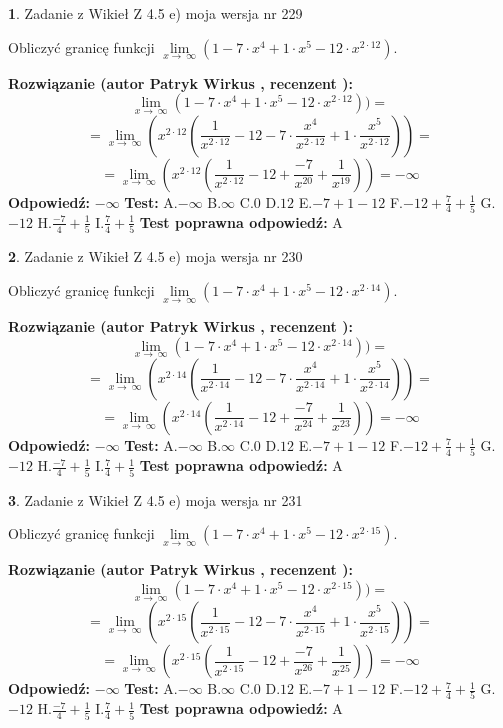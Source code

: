 \documentclass[12pt, a4paper]{article}
\theoremstyle{definition} %
\newtheorem{zad}{}
\newcommand{\zadStart}[1]{\begin{zad}#1\newline}
\newcommand{\zadStop}{\end{zad}}
\newcommand{\rozwStart}[2]{\noindent \textbf{Rozwiązanie (autor #1 , recenzent #2): }\newline}
\newcommand{\rozwStop}{\newline}
\newcommand{\odpStart}{\noindent \textbf{Odpowiedź:}\newline}
\newcommand{\odpStop}{\newline}
\newcommand{\testStart}{\noindent \textbf{Test:}\newline}
\newcommand{\testStop}{\newline}
\newcommand{\kluczStart}{\noindent \textbf{Test poprawna odpowiedź:}\newline}
\newcommand{\kluczStop}{\newline}
\begin{document}
\zadStart{Zadanie z Wikieł Z 4.5 e) moja wersja nr 229}



Obliczyć granicę funkcji  $\lim\limits_{x\to\ \infty}(1 - 7 \cdot x^{4}+1 \cdot x^{5}- 12 \cdot x^{2\cdot12})$.
\zadStop
\rozwStart{Patryk Wirkus}{}
$$\lim\limits_{x\to\ \infty}(1 - 7 \cdot x^{4}+1 \cdot x^{5}- 12 \cdot x^{2\cdot12}))=$$
$$=\lim\limits_{x\to\ \infty}(x^{2\cdot12}(\frac{1}{x^{2\cdot12}}-12 -7 \cdot \frac{x^{4}}{x^{2\cdot12}}+1 \cdot \frac{x^{5}}{x^{2\cdot12}}))=$$
$$=\lim\limits_{x\to\ \infty}(x^{2\cdot12}(\frac{1}{x^{2\cdot12}}-12 + \frac{-7}{x^{20}}+ \frac{1}{x^{19}}))=-\infty$$
\rozwStop
\odpStart
$-\infty$
\odpStop
\testStart
A.$-\infty$ B.$\infty$ C.$0$ D.$12$ E.$-7 + 1 - 12$
F.$-12+\frac{7}{4}+\frac{1}{5}$ G.$-12$
H.$\frac{-7}{4}+\frac{1}{5}$
I.$\frac{7}{4}+\frac{1}{5}$
\testStop
\kluczStart
A
\kluczStop



\zadStart{Zadanie z Wikieł Z 4.5 e) moja wersja nr 230}



Obliczyć granicę funkcji  $\lim\limits_{x\to\ \infty}(1 - 7 \cdot x^{4}+1 \cdot x^{5}- 12 \cdot x^{2\cdot14})$.
\zadStop
\rozwStart{Patryk Wirkus}{}
$$\lim\limits_{x\to\ \infty}(1 - 7 \cdot x^{4}+1 \cdot x^{5}- 12 \cdot x^{2\cdot14}))=$$
$$=\lim\limits_{x\to\ \infty}(x^{2\cdot14}(\frac{1}{x^{2\cdot14}}-12 -7 \cdot \frac{x^{4}}{x^{2\cdot14}}+1 \cdot \frac{x^{5}}{x^{2\cdot14}}))=$$
$$=\lim\limits_{x\to\ \infty}(x^{2\cdot14}(\frac{1}{x^{2\cdot14}}-12 + \frac{-7}{x^{24}}+ \frac{1}{x^{23}}))=-\infty$$
\rozwStop
\odpStart
$-\infty$
\odpStop
\testStart
A.$-\infty$ B.$\infty$ C.$0$ D.$12$ E.$-7 + 1 - 12$
F.$-12+\frac{7}{4}+\frac{1}{5}$ G.$-12$
H.$\frac{-7}{4}+\frac{1}{5}$
I.$\frac{7}{4}+\frac{1}{5}$
\testStop
\kluczStart
A
\kluczStop



\zadStart{Zadanie z Wikieł Z 4.5 e) moja wersja nr 231}



Obliczyć granicę funkcji  $\lim\limits_{x\to\ \infty}(1 - 7 \cdot x^{4}+1 \cdot x^{5}- 12 \cdot x^{2\cdot15})$.
\zadStop
\rozwStart{Patryk Wirkus}{}
$$\lim\limits_{x\to\ \infty}(1 - 7 \cdot x^{4}+1 \cdot x^{5}- 12 \cdot x^{2\cdot15}))=$$
$$=\lim\limits_{x\to\ \infty}(x^{2\cdot15}(\frac{1}{x^{2\cdot15}}-12 -7 \cdot \frac{x^{4}}{x^{2\cdot15}}+1 \cdot \frac{x^{5}}{x^{2\cdot15}}))=$$
$$=\lim\limits_{x\to\ \infty}(x^{2\cdot15}(\frac{1}{x^{2\cdot15}}-12 + \frac{-7}{x^{26}}+ \frac{1}{x^{25}}))=-\infty$$
\rozwStop
\odpStart
$-\infty$
\odpStop
\testStart
A.$-\infty$ B.$\infty$ C.$0$ D.$12$ E.$-7 + 1 - 12$
F.$-12+\frac{7}{4}+\frac{1}{5}$ G.$-12$
H.$\frac{-7}{4}+\frac{1}{5}$
I.$\frac{7}{4}+\frac{1}{5}$
\testStop
\kluczStart
A
\kluczStop
\end{document}
